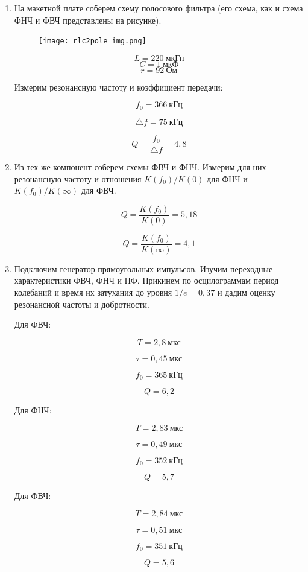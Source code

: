 \documentclass[a4paper, 12pt]{article}%
\begin{document}
\begin{enumerate}

\item На макетной плате соберем схему полосового фильтра (его схема, как и схема ФНЧ и ФВЧ представлены на рисунке).

\begin{figure}[h!]
\centering
\texttt{[image: rlc2pole\_img.png]}
\label{fig:Image1}
\end{figure}

\[L = 220 \: \textit{мкГн}\]
\[C = 1 \: \textit{мкФ}\]
\[r = 92 \: \textit{Ом}\]

Измерим резонансную частоту и коэффициент передачи:

\[f_0 = 366 \: \textit{кГц}\]

\[\triangle f = 75 \: \textit{кГц}\]

\[Q = \frac{f_0}{\triangle f} = 4,8\]

\item Из тех же компонент соберем схемы ФВЧ и ФНЧ. Измерим для них резонансную частоту и отношения $K(f_0)/K(0)$ для ФНЧ и $K(f_0)/K(\infty)$ для ФВЧ.

\[Q = \frac{K(f_0)}{K(0)} = 5,18\]

\[Q = \frac{K(f_0)}{K(\infty)} = 4,1\]

\item Подключим генератор прямоугольных импульсов. Изучим переходные характеристики ФВЧ, ФНЧ и ПФ. Прикинем по осцилограммам период колебаний и время их затухания до уровня $1/e = 0,37$ и дадим оценку резонансной частоты и добротности.

Для ФВЧ:

\[T = 2,8 \: \textit{мкс}\]

\[\tau = 0,45 \: \textit{мкс}\]

\[f_0 = 365 \: \textit{кГц}\]

\[Q = 6,2\]

Для ФНЧ:

\[T = 2,83 \: \textit{мкс}\]

\[\tau = 0,49 \: \textit{мкс}\]

\[f_0 = 352 \: \textit{кГц}\]

\[Q = 5,7\]

Для ФВЧ:

\[T = 2,84 \: \textit{мкс}\]

\[\tau = 0,51 \: \textit{мкс}\]

\[f_0 = 351 \: \textit{кГц}\]

\[Q = 5,6\]


\end{enumerate}
\end{document}
